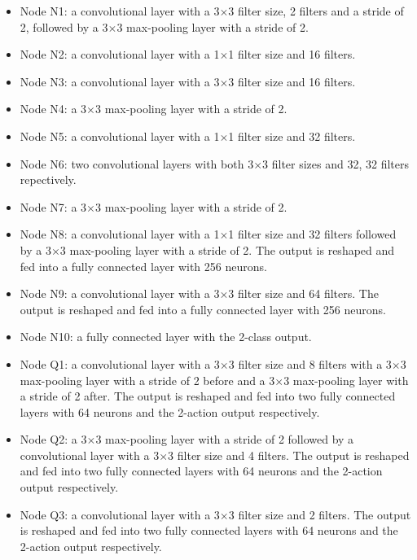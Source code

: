 \documentclass[10pt,twocolumn,letterpaper]{article}
\begin{document}
\begin{itemize}
\item Node N1: a convolutional layer with a 3$\times$3 filter size, 2 filters and a stride of 2,
  followed by a 3$\times$3 max-pooling layer with a stride of 2.

\item Node N2: a convolutional layer with a 1$\times$1 filter size and 16 filters.
  
\item Node N3: a convolutional layer with a 3$\times$3 filter size and 16 filters.
  
\item Node N4: a 3$\times$3 max-pooling layer with a stride of 2.
  
\item Node N5: a convolutional layer with a 1$\times$1 filter size and 32 filters.
  
\item Node N6: two convolutional layers with both 3$\times$3 filter sizes and 32, 32 filters repectively.

\item Node N7: a 3$\times$3 max-pooling layer with a stride of 2.

\item Node N8: a convolutional layer with a 1$\times$1 filter size and 32 filters followed by a 3$\times$3 max-pooling layer with a stride of 2.
  The output is reshaped and fed into a fully connected layer with 256 neurons.

\item Node N9: a convolutional layer with a 3$\times$3 filter size and 64 filters.
  The output is reshaped and fed into a fully connected layer with 256 neurons.

\item Node N10: a fully connected layer with the 2-class output.
  
\item Node Q1: a convolutional layer with a 3$\times$3 filter size and 8 filters with a 3$\times$3 max-pooling layer with a stride of 2 before and
   a 3$\times$3 max-pooling layer with a stride of 2 after.
  The output is reshaped and fed into two fully connected layers with 64 neurons and the 2-action output respectively.

\item Node Q2: a 3$\times$3 max-pooling layer with a stride of 2 followed by a convolutional layer with a 3$\times$3 filter size and 4 filters.
  The output is reshaped and fed into two fully connected layers with 64 neurons and the 2-action output respectively.

\item Node Q3: a convolutional layer with a 3$\times$3 filter size and 2 filters.
  The output is reshaped and fed into two fully connected layers with 64 neurons and the 2-action output respectively.

\end{itemize}
\end{document}
